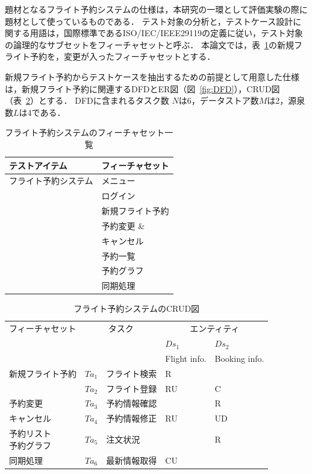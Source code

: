 題材となるフライト予約システムの仕様は，本研究の一環として評価実験の際に題材として使っているものである\cite{yumoto2015ICST}\cite{yumoto2016ICST}．
テスト対象の分析と，テストケース設計に関する用語は，国際標準であるISO/IEC/IEEE29119の定義に従い，テスト対象の論理的なサブセットをフィーチャセットと呼ぶ\cite{ISO29119}．%
本論文では，表~\ref{Featurelist}の新規フライト予約を，変更が入ったフィーチャセットとする．


新規フライト予約からテストケースを抽出するための前提として用意した仕様は，新規フライト予約に関連するDFDとER図（図~\ref{fig:DFD}），CRUD図（表~\ref{CRUD}）とする．
DFDに含まれるタスク数 $N$は6，データストア数$M$は2，源泉数$L$は4である．

\begin{table}[t]
\caption{フライト予約システムのフィーチャセット一覧}
\label{Featurelist}
\begin{center}
\begin{tabular}{l|l}
\hline
テストアイテム&フィーチャセット
\\
\hline\hline
フライト予約システム&メニュー\\
\cline{2-2}
&ログイン\\
\cline{2-2}
&新規フライト予約\\
\cline{2-2}
&予約変更 \&\\
&キャンセル\\
\cline{2-2}
&予約一覧\\
\cline{2-2}
&予約グラフ\\
\cline{2-2}
&同期処理\\
\hline
\end{tabular}
\end{center}
\end{table}

\begin{table}[t]
\caption{フライト予約システムのCRUD図}
\label{CRUD}
\begin{center}
{\footnotesize
\begin{tabular}{p{1.7 cm}|c|p{1.5 cm}||p{1 cm}|p{1cm}}
\hline
フィーチャセット&\multicolumn{2}{c||}{タスク}&\multicolumn{2}{c}{エンティティ}\\
&\multicolumn{2}{c||}{}&$Ds_1$&$Ds_2$\\
&\multicolumn{2}{c||}{}&Flight info.&Booking info.\\
\cline{4-5}
\hline\hline
新規フライト予約&$Ta_1$&フライト検索&R&\\
\cline{2-5}
&$Ta_2$&フライト登録&RU&C\\
\hline
予約変更&$Ta_3$&予約情報確認&&R\\
\cline{2-5}
キャンセル&$Ta_4$&予約情報修正&RU&UD\\
\hline
\shortstack{予約リスト\\予約グラフ}&$Ta_5$&注文状況&&R\\
\hline
\cline{2-5}
同期処理&$Ta_6$&最新情報取得&CU&\\
\hline
\end{tabular}
}
\end{center}
\end{table}%


